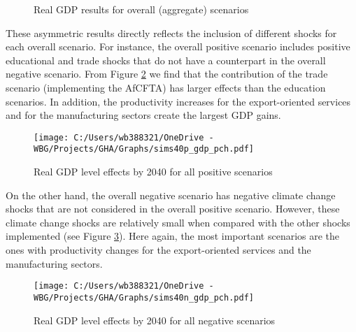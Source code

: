 \documentclass[11pt,english]{article}
\begin{document}
 \begin{figure}[ht!]\caption{Real GDP results for overall (aggregate) scenarios} \label{fig_sims_all_gdp}
\centering
\setlength\fboxsep{0pt}
\setlength\fboxrule{0.5pt}
\end{figure}

These asymmetric results directly reflects the inclusion of different shocks for each overall scenario. For instance, the overall positive scenario includes positive educational and trade shocks that do not have a counterpart in the overall negative scenario. From Figure \ref{fig_sims40p_gdp_pch} we find that the contribution of the trade scenario (implementing the AfCFTA) has larger effects than the education scenarios. In addition, the productivity increases for the export-oriented services and for the manufacturing sectors create the largest GDP gains. 

\begin{figure}[ht!]\caption{Real GDP level effects by 2040 for all positive scenarios} \label{fig_sims40p_gdp_pch}
	\centering
	\texttt{[image: C:/Users/wb388321/OneDrive - WBG/Projects/GHA/Graphs/sims40p\_gdp\_pch.pdf]}
\end{figure}

On the other hand, the overall negative scenario has negative climate change shocks that are not considered in the overall positive scenario. However, these climate change shocks are relatively small when compared with the other shocks implemented (see Figure \ref{fig_sims40n_gdp_pch}). Here again, the most important scenarios are the ones with productivity changes for the export-oriented services and the manufacturing sectors.


\begin{figure}[ht!]\caption{Real GDP level effects by 2040 for all negative scenarios} \label{fig_sims40n_gdp_pch}
	\centering
	\texttt{[image: C:/Users/wb388321/OneDrive - WBG/Projects/GHA/Graphs/sims40n\_gdp\_pch.pdf]}
\end{figure}
\end{document}
